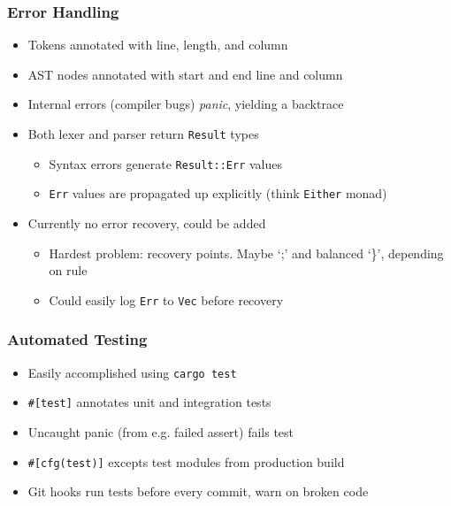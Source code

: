 \documentclass{beamer}
\begin{document}
\begin{frame}
    \frametitle{Error Handling}
    \begin{itemize}[<+(1)->]
        \item Tokens annotated with line, length, and column
        \item AST nodes annotated with start and end line and column
        \item Internal errors (compiler bugs) \textit{panic}, yielding a backtrace
        \item Both lexer and parser return \texttt{Result} types
            \begin{itemize}[<+(1)->]
                \item Syntax errors generate \texttt{Result::Err} values
                \item \texttt{Err} values are propagated up explicitly (think \texttt{Either}
                    monad)
            \end{itemize}
        \item Currently no error recovery, could be added
            \begin{itemize}[<+(1)->]
                \item Hardest problem: recovery points. Maybe `;' and balanced `\}', depending on rule
                \item Could easily log \texttt{Err} to \texttt{Vec} before
                    recovery
            \end{itemize}
    \end{itemize}
\end{frame}

\begin{frame}
    \frametitle{Automated Testing}
    \begin{itemize}[<+(1)->]
        \item Easily accomplished using \texttt{cargo test}
        \item \texttt{\#[test]} annotates unit and integration tests
        \item Uncaught panic (from e.g. failed assert) fails test
        \item \texttt{\#[cfg(test)]} excepts test modules from production build
        \item Git hooks run tests before every commit, warn on broken code
    \end{itemize}
\end{frame}
\end{document}
